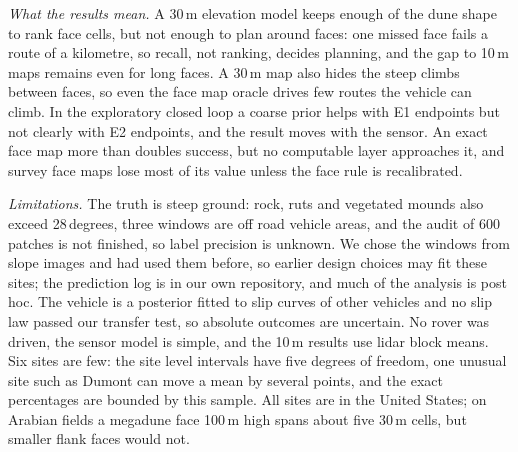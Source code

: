 \textit{What the results mean.} A 30\,m elevation model keeps enough of the dune shape to rank face cells, but not enough to plan around faces: one missed face fails a route of a kilometre, so recall, not ranking, decides planning, and the gap to 10\,m maps remains even for long faces. A 30\,m map also hides the steep climbs between faces, so even the face map oracle drives few routes the vehicle can climb. In the exploratory closed loop a coarse prior helps with E1 endpoints but not clearly with E2 endpoints, and the result moves with the sensor. An exact face map more than doubles success, but no computable layer approaches it, and survey face maps lose most of its value unless the face rule is recalibrated.

\textit{Limitations.} The truth is steep ground: rock, ruts and vegetated mounds also exceed 28\,degrees, three windows are off road vehicle areas, and the audit of 600 patches is not finished, so label precision is unknown. We chose the windows from slope images and had used them before, so earlier design choices may fit these sites; the prediction log is in our own repository, and much of the analysis is post hoc. The vehicle is a posterior fitted to slip curves of other vehicles and no slip law passed our transfer test, so absolute outcomes are uncertain. No rover was driven, the sensor model is simple, and the 10\,m results use lidar block means. Six sites are few: the site level intervals have five degrees of freedom, one unusual site such as Dumont can move a mean by several points, and the exact percentages are bounded by this sample. All sites are in the United States; on Arabian fields a megadune face 100\,m high spans about five 30\,m cells, but smaller flank faces would not.
